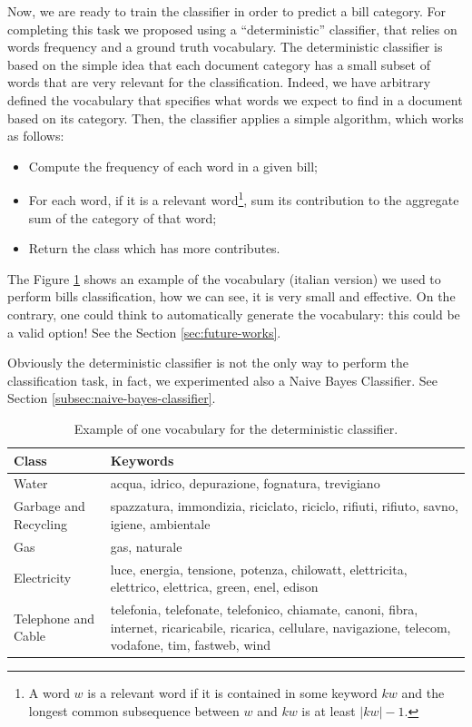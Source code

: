 \documentclass[10pt,twocolumn,letterpaper]{article}
\begin{document}
Now, we are ready to train the classifier in order to predict a bill
category. For completing this task we proposed using a
``deterministic'' classifier, that relies on words frequency and a
ground truth vocabulary. The deterministic classifier is based on the
simple idea that each document category has a small subset of words
that are very relevant for the classification. Indeed, we have
arbitrary defined the vocabulary that specifies what words we expect
to find in a document based on its category. Then, the classifier
applies a simple algorithm, which works as follows:

\begin{itemize}
  \item Compute the frequency of each word in a given bill;
  \item For each word, if it is a relevant word\footnote{A word $w$ is
    a relevant word if it is contained in some keyword $kw$ and the
    longest common subsequence between $w$ and $kw$ is at least $|kw|
    - 1$.}, sum its contribution to the aggregate sum of the category
    of that word;
  \item Return the class which has more contributes.
\end{itemize}

The Figure \ref{table:determnistic-classifier-dict} shows an example
of the vocabulary (italian version) we used to perform bills
classification, how we can see, it is very small and effective.  On
the contrary, one could think to automatically generate the
vocabulary: this could be a valid option! See the Section
\ref{sec:future-works}.

Obviously the deterministic classifier is not the only way to perform
the classification task, in fact, we experimented also a Naive Bayes
Classifier. See Section \ref{subsec:naive-bayes-classifier}.

\bgroup
\def\arraystretch{1.3}%
\begin{table}[!h]
  \begin{center}
    \begin{tabular}{p{2cm} p{5cm}}
      \hline
      Class & Keywords \\ \hline
      Water & acqua, idrico, depurazione, fognatura, trevigiano \\
      Garbage and Recycling & spazzatura, immondizia, riciclato, riciclo, rifiuti, rifiuto, savno, igiene, ambientale\\
      Gas & gas, naturale \\
      Electricity & luce, energia, tensione, potenza, chilowatt, elettricita, elettrico, elettrica, green, enel, edison \\
      Telephone and Cable & telefonia, telefonate, telefonico, chiamate, canoni, fibra, internet, ricaricabile, ricarica, cellulare, navigazione, telecom, vodafone, tim, fastweb, wind \\ \hline
    \end{tabular}
  \end{center}
  \label{table:determnistic-classifier-dict}
  \caption{Example of one vocabulary for the deterministic classifier.}
\end{table}
\egroup
\end{document}

